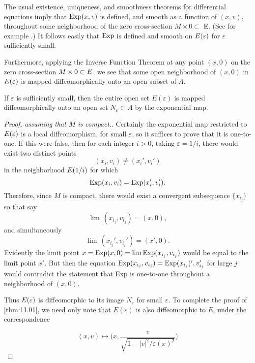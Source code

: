 \documentclass[../main]{subfiles}
\begin{document}
The usual existence, uniqueness, and smoothness theorems for differential equations imply that $\operatorname{Exp}(x, v)$ is defined, and smooth as a function of $(x, v)$, throughout some neighborhood of the zero cross-section $M \times 0 \subset$ E. (See for example \cite{bishop2011}.) It follows easily that $\operatorname{Exp}$ is defined and smooth on $E(\varepsilon)$ for $\varepsilon$ sufficiently small.

Furthermore, applying the Inverse Function Theorem at any point $(x, 0)$ on the zero cross-section $M \times 0 \subset E$, we see that some open neighborhood of $(x, 0)$ in $E(\varepsilon)$ is mapped diffeomorphically onto an open subset of $A$.


\begin{assertion*} If $\varepsilon$ is sufficiently small, then the entire open set $E(\varepsilon)$ is mapped diffeomorphically onto an open set $N_{\varepsilon} \subset A$ by the exponential map.
\end{assertion*}


\begin{proof}[Proof, assuming that $M$ is compact.] Certainly the exponential map restricted to $E(\varepsilon)$ is a local diffeomorphism, for small $\varepsilon$, so it suffices to prove that it is one-to-one. If this were false, then for each integer $i > 0$, taking $\varepsilon= 1 / i$, there would exist two distinct points
\[
(x_{i}, v_{i}) \ne (x_{i}', v_{i}')
\]
in the neighborhood $E(1 / i)$ for which
\[
\operatorname{Exp}(x_{i}, v_{i})=\operatorname{Exp}(x_{i}', v_{i}') .
\]
Therefore, since $M$ is compact, there would exist a convergent subsequence $\{x_{i_{j}}\}$ so that say
\[
\lim \,(x_{i_{j}}, v_{i_{j}})=(x, 0),
\]
and simultaneously
\[
\lim \,(x_{i_{j}}', v_{i_{j}}')=(x', 0) .
\]
Evidently the limit point $x=\operatorname{Exp}(x, 0)=\lim \operatorname{Exp}(x_{i_{j}}, v_{i_{j}})$ would be equal to the limit point $x'$. But then the equation $\operatorname{Exp}(x_{i_{j}}, v_{i_{j}})=\operatorname{Exp}(x_{i_{j}})', v_{i_{j}}'$ for large $j$ would contradict the statement that Exp is one-to-one throughout a neighborhood of $(x, 0)$.

Thus $E(\varepsilon)$ is diffeomorphic to its image $N_{\varepsilon}$ for small $\varepsilon$. To complete the proof of \ref{thm:11.01}, we need only note that $E(\varepsilon)$ is also diffeomorphic to $E$, under the correspondence

\[
(x,v) \mapsto \bigg(x, \frac{v}{\sqrt{1 - |v|^2 / \varepsilon(x)^2}}\bigg)
\]

\end{proof}
\end{document}
